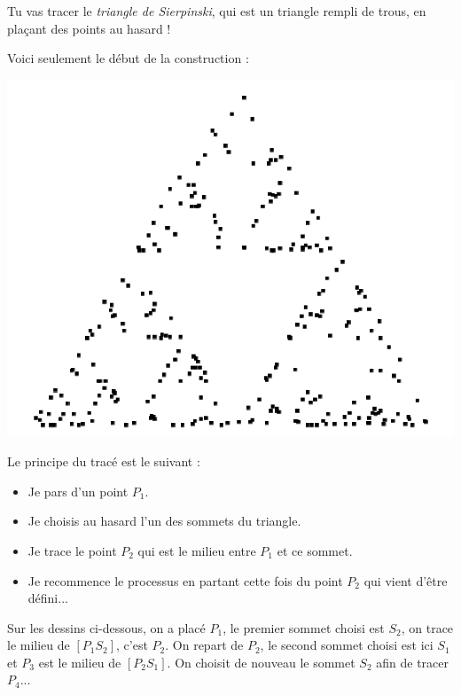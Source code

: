 \documentclass[class=report,crop=false, 12pt]{standalone}
\begin{document}
\begin{activite}

Tu vas tracer le \emph{triangle de Sierpinski}, qui est un triangle rempli de trous, en plaçant des points au hasard !

Voici seulement le début de la construction :
\begin{center}
  \includegraphics[scale=\scaleecran,scale=0.7]{ecran-06-ex2} 
\end{center}

Le principe du tracé est le suivant :
\begin{itemize}
  \item Je pars d'un point $P_1$.
  \item Je choisis au hasard l'un des sommets du triangle.
  \item Je trace le point $P_2$ qui est le milieu entre $P_1$ et ce sommet.
  \item Je recommence le processus en partant cette fois du point $P_2$ qui vient d'être défini...
\end{itemize}

Sur les dessins ci-dessous, on a placé $P_1$, le premier sommet choisi est $S_2$, on trace le milieu de $[P_1S_2]$, c'est $P_2$. On repart de $P_2$, le second sommet choisi est ici $S_1$ et $P_3$ est le milieu de $[P_2S_1]$. On choisit de nouveau le sommet $S_2$ afin de tracer $P_4$...



\end{activite}
\end{document}
